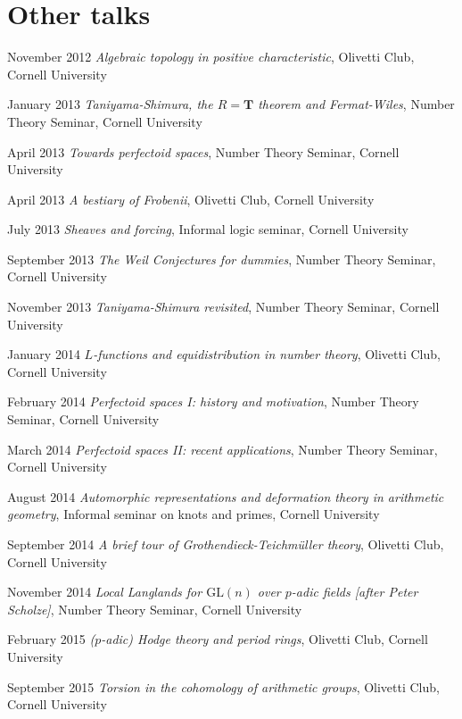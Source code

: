 \documentclass[11pt,a4paper]{moderncv}
\begin{document}
\section{Other talks}

\cvline
  {November 2012}
  {\emph{Algebraic topology in positive characteristic},
  Olivetti Club,
  Cornell University}
  
\cvline
  {January 2013}
  {\emph{Taniyama-Shimura, the $R=\mathbf{T}$ theorem and Fermat-Wiles},
  Number Theory Seminar,
  Cornell University}
  
\cvline
  {April 2013}
  {\emph{Towards perfectoid spaces},
  Number Theory Seminar,
  Cornell University}
  
\cvline
  {April 2013}
  {\emph{A bestiary of Frobenii},
  Olivetti Club,
  Cornell University}

\cvline
  {July 2013}
  {\emph{Sheaves and forcing},
  Informal logic seminar,
  Cornell University}
  
\cvline
  {September 2013}
  {\emph{The Weil Conjectures for dummies},
  Number Theory Seminar,
  Cornell University}
  
\cvline
  {November 2013}
  {\emph{Taniyama-Shimura revisited},
  Number Theory Seminar,
  Cornell University}
  
\cvline
  {January 2014}
  {\emph{$L$-functions and equidistribution in number theory},
  Olivetti Club,
  Cornell University}

\cvline
  {February 2014}
  {\emph{Perfectoid spaces I: history and motivation},
  Number Theory Seminar,
  Cornell University}

\cvline
  {March 2014}
  {\emph{Perfectoid spaces II: recent applications},
  Number Theory Seminar,
  Cornell University}
  
\cvline
  {August 2014}
  {\emph{Automorphic representations and deformation theory in arithmetic geometry},
  Informal seminar on knots and primes,
  Cornell University}
  
\cvline
  {September 2014}
  {\emph{A brief tour of Grothendieck-Teichm\"uller theory},
  Olivetti Club,
  Cornell University}
  
\cvline
  {November 2014}
  {\emph{Local Langlands for $\mathrm{GL}(n)$ over $p$-adic fields [after Peter Scholze]},
  Number Theory Seminar,
  Cornell University}
  
\cvline
  {February 2015}
  {\emph{($p$-adic) Hodge theory and period rings},
  Olivetti Club,
  Cornell University}
  
\cvline
  {September 2015}
  {\emph{Torsion in the cohomology of arithmetic groups},
  Olivetti Club,
  Cornell University}
\end{document}
